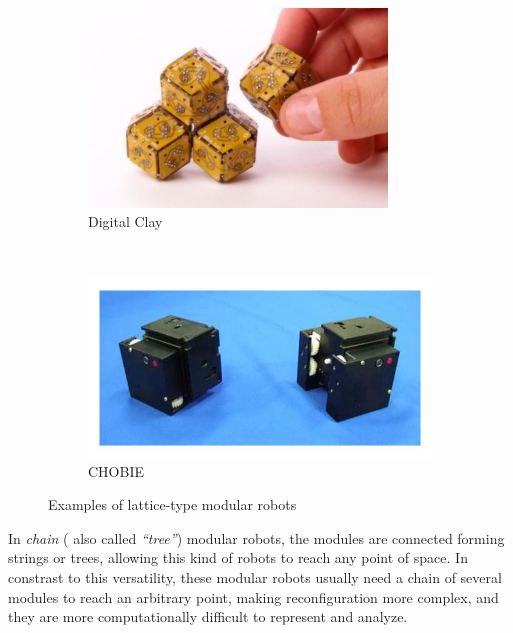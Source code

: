 \begin{figure}[h]
\begin{subfigure}[b]{0.18\textwidth}
                \label{fig:telecube}
        \end{subfigure}
        ~
        \begin{subfigure}[b]{0.24\textwidth}
         	   \centering
                \includegraphics[width=\textwidth]{images/digitalclay.jpg}
                \caption{Digital Clay}
                \label{fig:digital_clay}
        \end{subfigure}        
        ~
        \begin{subfigure}[b]{0.28\textwidth}
         	   \centering
                \includegraphics[width=\textwidth]{images/CHOBIE.jpg}
                \caption{CHOBIE}
                \label{fig:chobie}
        \end{subfigure}
        \caption{Examples of lattice-type modular robots}\label{fig:config_lattice_examples}
\end{figure}

In \emph{chain} ( also called \emph{``tree''}) modular robots, the modules are connected forming strings or trees, allowing this kind of robots to reach any point of space. In constrast to this versatility, these modular robots usually need a chain of several modules to reach an arbitrary point, making reconfiguration more complex, and they are more computationally difficult to represent and analyze.\\


